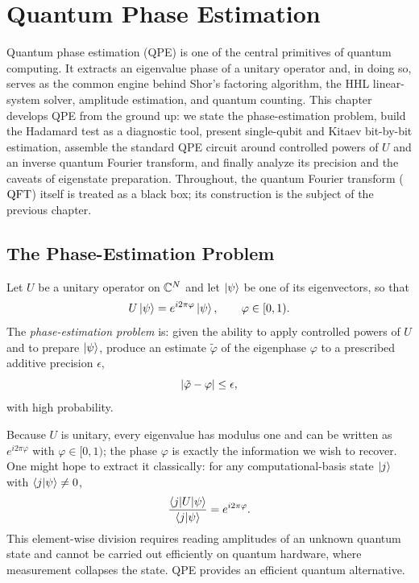 \providecommand{\ketbra}[2]{\ket{#1}\!\bra{#2}}

\chapter{Quantum Phase Estimation}

Quantum phase estimation (QPE) is one of the central primitives of quantum
computing. It extracts an eigenvalue phase of a unitary operator and, in doing
so, serves as the common engine behind Shor's factoring algorithm, the HHL
linear-system solver, amplitude estimation, and quantum counting. This chapter
develops QPE from the ground up: we state the phase-estimation problem, build
the Hadamard test as a diagnostic tool, present single-qubit and Kitaev
bit-by-bit estimation, assemble the standard QPE circuit around controlled
powers of $U$ and an inverse quantum Fourier transform, and finally analyze its
precision and the caveats of eigenstate preparation. Throughout, the quantum
Fourier transform ($\mathrm{QFT}$) itself is treated as a black box; its construction
is the subject of the previous chapter.

\section{The Phase-Estimation Problem}

\begin{definition}
Let $U$ be a unitary operator on $\mathbb{C}^{N}$ and let $\ket{\psi}$ be one of its
eigenvectors, so that
\[
  U\ket{\psi}=e^{i2\pi\varphi}\ket{\psi},\qquad \varphi\in[0,1).
\]
The \emph{phase-estimation problem} is: given the ability to apply controlled
powers of $U$ and to prepare $\ket{\psi}$, produce an estimate $\tilde\varphi$
of the eigenphase $\varphi$ to a prescribed additive precision $\epsilon$,
\[
  \lvert\tilde\varphi-\varphi\rvert\le\epsilon,
\]
with high probability.
\end{definition}

Because $U$ is unitary, every eigenvalue has modulus one and can be written as
$e^{i2\pi\varphi}$ with $\varphi\in[0,1)$; the phase $\varphi$ is exactly the
information we wish to recover. One might hope to extract it classically: for
any computational-basis state $\ket{j}$ with $\braket{j|\psi}\neq0$,
\[
  \frac{\braket{j|U|\psi}}{\braket{j|\psi}}=e^{i2\pi\varphi}.
\]
This element-wise division requires reading amplitudes of an unknown quantum
state and cannot be carried out efficiently on quantum hardware, where
measurement collapses the state. QPE provides an efficient quantum alternative.

